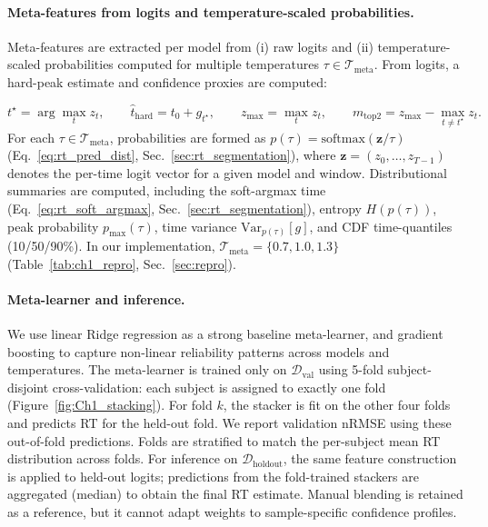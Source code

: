 \documentclass[12pt]{article}
\begin{document}
\paragraph{Meta-features from logits and temperature-scaled probabilities.}
Meta-features are extracted per model from (i) raw logits and (ii) temperature-scaled probabilities computed for multiple
temperatures $\tau\in\mathcal{T}_{\text{meta}}$. From logits, a hard-peak estimate and confidence proxies are computed:

\begin{equation}
\label{eq:rt_stacking_logit_features}
t^\star = \arg\max_{t} z_t,\qquad
\hat t_{\mathrm{hard}} = t_0 + g_{t^\star},\qquad
z_{\max} = \max_t z_t,\qquad
m_{\mathrm{top2}} = z_{\max} - \max_{t\neq t^\star} z_t.
\end{equation}
For each $\tau\in\mathcal{T}_{\text{meta}}$, probabilities are formed as $p(\tau)=\mathrm{softmax}(\mathbf{z}/\tau)$ (Eq.~\ref{eq:rt_pred_dist}, Sec.~\ref{sec:rt_segmentation}), where $\mathbf{z}=(z_0,\dots,z_{T-1})$ denotes the per-time logit vector for a given model and window. Distributional summaries
are computed, including the soft-argmax time (Eq.~\ref{eq:rt_soft_argmax}, Sec.~\ref{sec:rt_segmentation}), entropy $H(p(\tau))$, peak probability
$p_{\max}(\tau)$, time variance $\mathrm{Var}_{p(\tau)}[g]$, and CDF time-quantiles (10/50/90\%). In our implementation,
$\mathcal{T}_{\text{meta}}=\{0.7,1.0,1.3\}$ (Table~\ref{tab:ch1_repro}, Sec.~\ref{sec:repro}).

\paragraph{Meta-learner and inference.}
We use linear Ridge regression as a strong baseline meta-learner, and gradient boosting to capture non-linear reliability
patterns across models and temperatures. The meta-learner is trained only on $\mathcal{D}_{\text{val}}$ using 5-fold subject-disjoint cross-validation: each subject is assigned to exactly one fold (Figure~\ref{fig:Ch1_stacking}). For fold $k$, the stacker is fit on the other four folds and predicts RT for the held-out fold. We report validation nRMSE using these out-of-fold predictions. Folds are stratified to match the per-subject mean RT distribution across folds. For inference on $\mathcal{D}_{\text{holdout}}$, the same feature construction is applied to held-out logits; predictions from the fold-trained stackers are aggregated (median) to obtain the final RT estimate. 
Manual blending is retained as a reference, but it cannot adapt weights to sample-specific confidence profiles.
\end{document}
